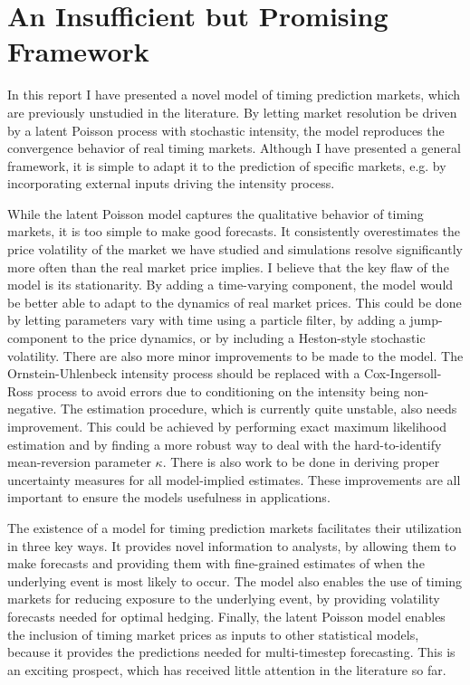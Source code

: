 \documentclass[a4paper, 12pt]{article}
\begin{document}
\section{An Insufficient but Promising Framework}
In this report I have presented a novel model of timing prediction markets, which are previously unstudied in the literature. By letting market resolution be driven by a latent Poisson process with stochastic intensity, the model reproduces the convergence behavior of real timing markets. Although I have presented a general framework, it is simple to adapt it to the prediction of specific markets, e.g. by incorporating external inputs driving the intensity process.

While the latent Poisson model captures the qualitative behavior of timing markets, it is too simple to make good forecasts. It consistently overestimates the price volatility of the market we have studied and simulations resolve significantly more often than the real market price implies. I believe that the key flaw of the model is its stationarity. By adding a time-varying component, the model would be better able to adapt to the dynamics of real market prices. This could be done by letting parameters vary with time using a particle filter, by adding a jump-component to the price dynamics, or by including a Heston-style stochastic volatility. There are also more minor improvements to be made to the model. The Ornstein-Uhlenbeck intensity process should be replaced with a Cox-Ingersoll-Ross process to avoid errors due to conditioning on the intensity being non-negative. The estimation procedure, which is currently quite unstable, also needs improvement. This could be achieved by performing exact maximum likelihood estimation and by finding a more robust way to deal with the hard-to-identify mean-reversion parameter \(\kappa\). There is also work to be done in deriving proper uncertainty measures for all model-implied estimates. These improvements are all important to ensure the models usefulness in applications.

The existence of a model for timing prediction markets facilitates their utilization in three key ways. It provides novel information to analysts, by allowing them to make forecasts and providing them with fine-grained estimates of when the underlying event is most likely to occur. The model also enables the use of timing markets for reducing exposure to the underlying event, by providing volatility forecasts needed for optimal hedging. Finally, the latent Poisson model enables the inclusion of timing market prices as inputs to other statistical models, because it provides the predictions needed for multi-timestep forecasting. This is an exciting prospect, which has received little attention in the literature so far.   




\end{document}
